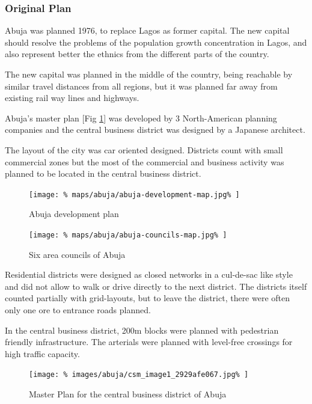 \documentclass{article}
\begin{document}
	\begin{multicols}{2}		
		\raggedcolumns
				
			\subsubsection{Original Plan}			
			Abuja was planned 1976, to replace Lagos as former capital.
			The new capital should resolve the problems of the population growth concentration in Lagos, and also represent better the ethnics from the different parts of the country.			
			
			The new capital was planned in the middle of the country, being reachable by similar travel distances from all regions, but it was planned far away from existing rail way lines and highways.
			
			Abuja's master plan [Fig \ref{fig:map:abuja-development-plan}] was developed by 3 North-American planning companies and the central business district was designed by a Japanese architect.
			
			The layout of the city was car oriented designed. Districts count with small commercial zones but the most of the commercial and business activity was planned to be located in the central business district.
			
			\begin{figure}[H]
				\texttt{[image: \%
					maps/abuja/abuja-development-map.jpg\%
				]}
				\caption{Abuja development plan  \cite{NairalandForum:AbujaMap}}
				\label{fig:map:abuja-development-plan}
			\end{figure}
			
			\begin{figure}[H]
				\texttt{[image: \%
					maps/abuja/abuja-councils-map.jpg\%
				]}
				\caption{Six area councils of Abuja  \cite{ResearchGate:SixCouncils}}
				\label{fig:map:abuja-six-area-councils}
			\end{figure}
			
			Residential districts were designed as closed networks in a cul-de-sac like style and did not allow to walk or drive directly to the next district. The districts itself counted partially with grid-layouts, but to leave the district, there were often only one ore to entrance roads planned.
			
			In the central business district, 200m blocks were planned with pedestrian friendly infrastructure.
			The arterials were planned with level-free crossings for high traffic capacity.
			
			\begin{figure}[H]
				\texttt{[image: \%
					images/abuja/csm\_image1\_2929afe067.jpg\%
				]}
				\caption{Master Plan for the central business district of Abuja \cite{ASplusP:MasterPlanReview}}
				\label{fig:map:abuja-master-plan-cbd}
			\end{figure}	
			

\end{multicols}
\end{document}
